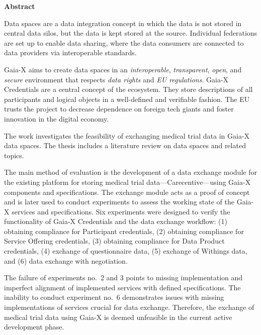 \documentclass{maddoc}
\begin{document}
\vspace{5.0cm}

\begin{center}
\bfseries
Abstract
\normalfont
\end{center}

Data spaces are a data integration concept in which the data is not stored in central data silos, but the data is kept stored at the source.
Individual federations are set up to enable data sharing, where the data consumers are connected to data providers via interoperable standards.

Gaia-X aims to create data spaces in an \textit{interoperable}, \textit{transparent}, \textit{open}, and \textit{secure} environment that respects \textit{data rights} and \textit{EU regulations}.
Gaia-X Credentials are a central concept of the ecosystem.
They store descriptions of all participants and logical objects in a well-defined and verifiable fashion.
The EU trusts the project to decrease dependence on foreign tech giants and foster innovation in the digital economy.

The work investigates the feasibility of exchanging medical trial data in Gaia-X data spaces.
The thesis includes a literature review on data spaces and related topics.

The main method of evaluation is the development of a data exchange module for the existing platform for storing medical trial data---Carecentive---using Gaia-X components and specifications.
The exchange module acts as a proof of concept and is later used to conduct experiments to assess the working state of the Gaia-X services and specifications.
Six experiments were designed to verify the functionality of Gaia-X Credentials and the data exchange workflow: (1) obtaining compliance for Participant credentials, (2) obtaining compliance for Service Offering credentials, (3) obtaining compliance for Data Product credentials, (4) exchange of questionnaire data, (5) exchange of Withings data, and (6) data exchange with negotiation.

The failure of experiments no.~2 and 3 points to missing implementation and imperfect alignment of implemented services with defined specifications.
The inability to conduct experiment no.~6 demonstrates issues with missing implementations of services crucial for data exchange.
Therefore, the exchange of medical trial data using Gaia-X is deemed unfeasible in the current active development phase.


\tableofcontents
\cleardoublepage
\end{document}
